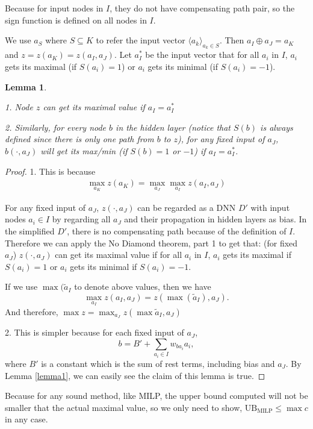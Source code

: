 \documentclass[]{article}
\newtheorem{lemma}{Lemma}
\theoremstyle{definition}
\begin{document}
Because for input nodes in $I$, they do not have compensating path pair, so the sign function is defined on
all nodes in $I$.



We use $a_S$ where $S\subseteq K$ to refer the input vector $\langle a_k\rangle_{a_k\in S}$. Then $a_I\oplus a_J = a_K$ and $z=z(a_K)=z(a_I,a_J)$.		Let $a_I^*$ be the input vector that for all $a_i$ in $I$, $a_i$ gets its maximal (if $S(a_i)=1$) or $a_i$ gets its minimal (if $S(a_i)=-1$).

\begin{lemma} \label{lem:reach_max}
	
	1. Node $z$ can get its maximal value if $a_I=a_I^*$
	
	2. Similarly, for every node $b$ in the hidden layer (notice that $S(b)$ is always defined since there is only one path from $b$ to $z$), for any fixed input of $a_J$,  $b(\cdot,a_J)$ will get its max/min (if $S(b)=1$ or $-1$) if $a_I=a_I^*$.
\end{lemma}

\begin{proof}
	
	
	
	1. This is because \begin{align*}
		\max_{a_K} z(a_K) = \max_{a_J}\max_{a_I} z(a_I,a_J)
	\end{align*}
	
	For any fixed input of $a_J$, $z(\cdot, a_J)$ can be regarded as a DNN $D'$ with input nodes $a_i\in I$ by regarding all $a_J$ and their propagation in hidden layers as bias. In the simplified $D'$, there is no compensating path because of the definition of $I$. Therefore we can apply the No Diamond theorem, part 1 to get that: (for fixed $a_J$) $z(\cdot,a_J)$ can get its maximal value if for all $a_i$ in $I$, $a_i$ gets its maximal if $S(a_i)=1$ or $a_i$ gets its minimal if $S(a_i)=-1$.
	
	If we use $\max(\tilde{a}_I$ to denote above values, then we have $$\max_{a_I}z(a_I,a_J)=z(\max(\tilde{a}_I),a_J).$$ And therefore, $\max z=\max_{a_J} z(\max\tilde{a}_I,a_J)$
	
	2. This is simpler because for each fixed input of $a_J$, $$b= B'+\sum_{a_i\in I} w_{ba_i}a_i,$$ where $B'$ is a constant which is the sum of rest terms, including bias and $a_J$. By Lemma \ref{lemma1}, we can easily see the claim of this lemma is true.
\end{proof}


Because for any  sound method, like MILP, the upper bound computed will not be smaller that the actual maximal value, so we only need to show, $\mathrm{UB}_{\mathrm{MILP}}\leq \max c$ in any case.
\end{document}

